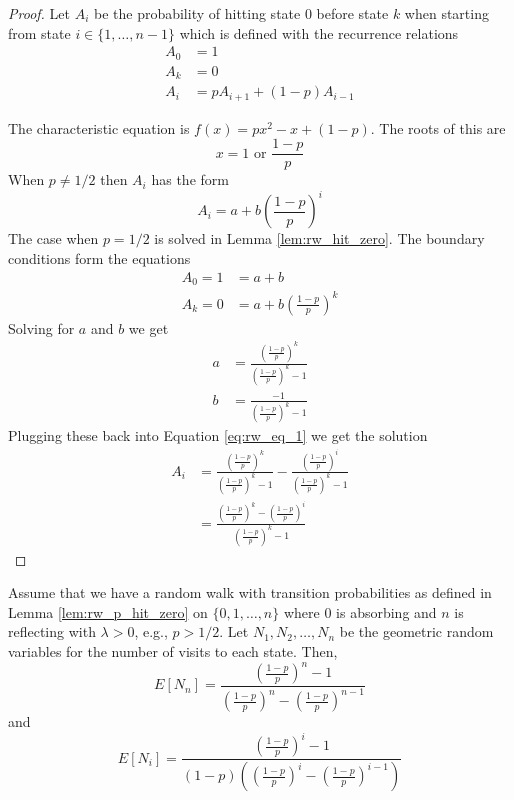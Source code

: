 \begin{proof}
Let $A_i$ be the probability of hitting state 0 before state $k$ when starting from state $i \in \{1,\ldots, n - 1\}$ which is defined with the recurrence relations
\begin{align*}
    A_0 &= 1\\
    A_{k} &= 0\\
    A_i &= p A_{i + 1} + (1 - p) A_{i - 1}
\end{align*}

The characteristic equation is $f(x) = p x^2 - x + (1 - p)$.
The roots of this are
$$
x = 1 \text{ or } \frac{1 - p}{p}
$$
When $p \not = 1/2$ then $A_i$ has the form
\begin{equation}\label{eq:rw_eq_1}
    A_i = a + b \left( \frac{1 - p}{p} \right)^i
\end{equation}
The case when $p = 1/2$ is solved in Lemma \ref{lem:rw_hit_zero}.
The boundary conditions form the equations
\begin{align*}
    A_0 = 1 &= a + b\\
    A_k = 0 &= a + b  \left( \frac{1 - p}{p} \right)^{k}
\end{align*}
Solving for $a$ and $b$ we get
\begin{align*}
    a &= \frac{\left( \frac{1 - p}{p} \right)^{k}}{\left( \frac{1 - p}{p} \right)^{k} - 1}\\
    b &= \frac{-1}{\left( \frac{1 - p}{p} \right)^{k} - 1}
\end{align*}
Plugging these back into Equation \ref{eq:rw_eq_1} we get the solution
\begin{align*}
    A_i &= \frac{
        \left( \frac{1 - p}{p} \right)^{k}
    }{
        \left( \frac{1 - p}{p} \right)^{k} - 1
    } -
    \frac{
        \left( \frac{1 - p}{p} \right)^{i}
    }{
        \left( \frac{1 - p}{p} \right)^{k} - 1
    }\\
    &= \frac{
        \left( \frac{1 - p}{p} \right)^{k} - \left( \frac{1 - p}{p} \right)^{i}
    }{
         \left( \frac{1 - p}{p} \right)^{k} - 1
    }
\end{align*}
\end{proof}

\begin{theorem}\label{thm:expected_visits_rw_p}
Assume that we have a random walk with transition probabilities as defined in Lemma \ref{lem:rw_p_hit_zero} on $\{0,1,\ldots, n\}$ where 0 is absorbing and $n$ is reflecting with $\lambda > 0$, e.g., $p > 1/2$.
Let $N_1, N_2, \ldots, N_n$ be the geometric random variables for the number of visits to each state.
Then,
$$
E[N_n] = \frac{
        \left( \frac{1 - p}{p} \right)^{n} - 1
    }{
        \left( \frac{1 - p}{p} \right)^{n} - \left( \frac{1 - p}{p} \right)^{n - 1}
    }
$$
and
$$
E[N_i] = \frac{
        \left( \frac{1 - p}{p} \right)^{i} - 1
    }{
        (1 - p) \left( \left( \frac{1 - p}{p} \right)^{i} - \left( \frac{1 - p}{p} \right)^{i - 1}\right)
    }
$$
\end{theorem}

